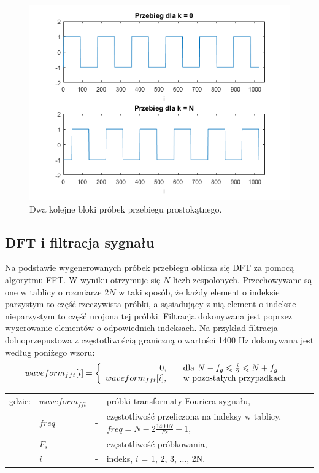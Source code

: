 \begin{figure}[H]
	\centering
	\includegraphics[width=12cm]{grafiki/sub_waveform_blocks}
	\captionsetup{justification=centering}
	\caption{Dwa kolejne bloki próbek przebiegu prostokątnego.}
	\label{rys:sub_waveform_blocks}
\end{figure}

\subsection{DFT i filtracja sygnału}
Na podstawie wygenerowanych próbek przebiegu oblicza się DFT za pomocą algorytmu FFT. W wyniku otrzymuje się $N$ liczb zespolonych. Przechowywane są one w tablicy o rozmiarze $2N$ w taki sposób, że każdy element o indeksie parzystym to część rzeczywista próbki, a sąsiadujący z nią element o indeksie nieparzystym to część urojona tej próbki. Filtracja dokonywana jest poprzez wyzerowanie elementów o odpowiednich indeksach. Na przykład filtracja dolnoprzepustowa z częstotliwością graniczną o wartości 1400 Hz dokonywana jest według poniżego wzoru:
\begin{equation} \label{equ:sub_3}
waveform_{fft}[i]=\left \{\begin{array}{ r l }
0, & \quad  \text{dla } N - f_g \leqslant \frac{i}{2} \leqslant N + f_g \\
waveform_{fft}[i], & \quad \text{w pozostałych przypadkach } 

\end{array}
\right.
\end{equation}
\begin{tabular}{ l l l l}
	gdzie: & $waveform_{fft}$ &  - & próbki transformaty Fouriera sygnału, \\
	&	$freq$ & - &  częstotliwość przeliczona na indeksy w tablicy, $freq = N - 2 \frac{1400N}{Fs} - 1$, \\
	&	$F_s$ & - & częstotliwość próbkowania,\\
	&	$i$ & - &  indeks, $i$ = 1, 2, 3, ..., 2N.\\
\end{tabular} \\ \\

